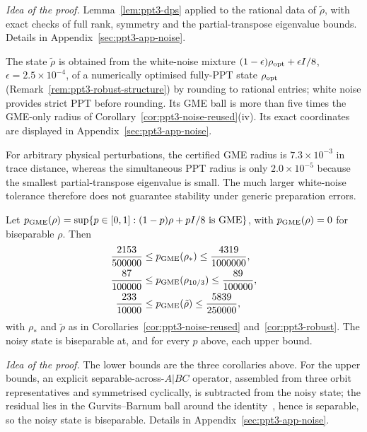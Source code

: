 \emph{Idea of the proof.} Lemma~\ref{lem:ppt3-dps} applied to the rational data of $\tilde\rho$, with exact checks of full rank, symmetry and the
partial-transpose eigenvalue bounds. Details in Appendix~\ref{sec:ppt3-app-noise}.

The state $\tilde\rho$ is obtained from the white-noise mixture $(1-\epsilon)\rho_{\rm opt}+\epsilon I/8$, $\epsilon=2.5\times10^{-4}$, of a
numerically optimised fully-PPT state $\rho_{\rm opt}$ (Remark~\ref{rem:ppt3-robust-structure}) by rounding to rational
entries; white noise provides strict PPT before rounding. Its GME ball is more than five times the GME-only radius of
Corollary~\ref{cor:ppt3-noise-reused}(iv). Its exact coordinates are displayed in Appendix~\ref{sec:ppt3-app-noise}.

For arbitrary physical perturbations, the certified GME radius is $7.3\times10^{-3}$ in trace distance, whereas the
simultaneous PPT radius is only $2.0\times10^{-5}$ because the smallest partial-transpose eigenvalue is small.
The much larger white-noise tolerance therefore does not guarantee stability under generic preparation errors.

\begin{proposition}\label{prop:ppt3-noise-sharp}
Let $p_{\rm GME}(\rho)=\sup\{p\in[0,1]:(1-p)\rho+pI/8\text{ is GME}\}$, with $p_{\rm GME}(\rho)=0$ for biseparable $\rho$. Then
\begin{align*}
 \frac{2153}{500000}&\le p_{\rm GME}(\rho_*)\le \frac{4319}{1000000},\\
 \frac{87}{100000}&\le p_{\rm GME}(\rho_{10/3})\le \frac{89}{100000},\\
 \frac{233}{10000}&\le p_{\rm GME}(\tilde\rho)\le \frac{5839}{250000},
\end{align*}
with $\rho_*$ and $\tilde\rho$ as in Corollaries~\ref{cor:ppt3-noise-reused} and~\ref{cor:ppt3-robust}. The noisy state is
biseparable at, and for every $p$ above, each upper bound.
\end{proposition}

\emph{Idea of the proof.} The lower bounds are the three corollaries above. For the upper bounds, an explicit separable-across-$A|BC$ operator,
assembled from three orbit representatives and symmetrised cyclically, is subtracted from the noisy state; the residual lies in the
Gurvits--Barnum ball around the identity~\cite{GB}, hence is separable, so the noisy state is biseparable. Details in Appendix~\ref{sec:ppt3-app-noise}.

